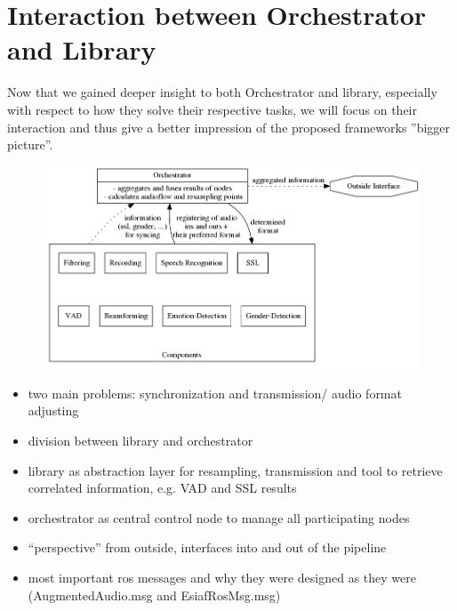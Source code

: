 


\section{Interaction between Orchestrator and Library}

Now that we gained deeper insight to both Orchestrator and library, especially with respect to how they solve their respective tasks, we will focus on their interaction and thus give a better impression of the proposed frameworks ''bigger picture''.



\begin{figure}[]
	\centering
	\includegraphics[width=\textwidth]{bilder/graphs/architecture.png}
	\caption{}
	\label{pic:main:combi:arcitecture}
\end{figure}


\begin{itemize}
	\item two main problems: synchronization and transmission/ audio format adjusting
	\item division between library and orchestrator
	\item library as abstraction layer for resampling, transmission and tool to retrieve correlated information, e.g. VAD and SSL results
	\item orchestrator as central control node to manage all participating nodes
	\item ``perspective'' from outside, interfaces into and out of the pipeline
	\item most important ros messages and why they were designed as they were (AugmentedAudio.msg and EsiafRosMsg.msg)
\end{itemize}

